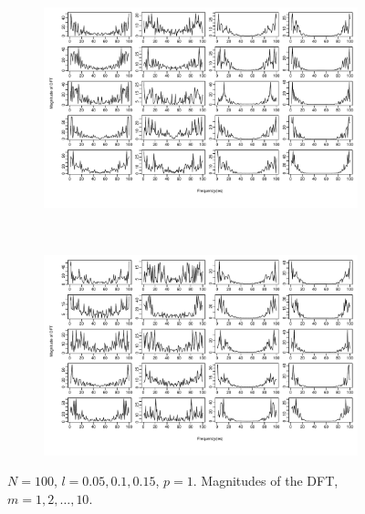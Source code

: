 \documentclass[11pt, a4paper]{article} %
\begin{document}
\begin{figure}
\begin{subfigure}{1.1\textwidth}
  \centering
  \includegraphics[width=\linewidth]{N100_MagnDFT_p1_m_1_5.pdf}
  \label{fig:sfig1}
\end{subfigure}\\
\begin{subfigure}{1.1\textwidth}
  \centering
  \includegraphics[width=\linewidth]{N100_MagnDFT_p1_m_6_10.pdf}
  \label{fig:sfig2}
\end{subfigure}
\label{fig1}
\caption{$N = 100$, $l = 0.05, 0.1, 0.15$, $p = 1$. Magnitudes of the DFT, $m = 1,2, \dots, 10$.}
\end{figure}

\restoregeometry
\end{document}
